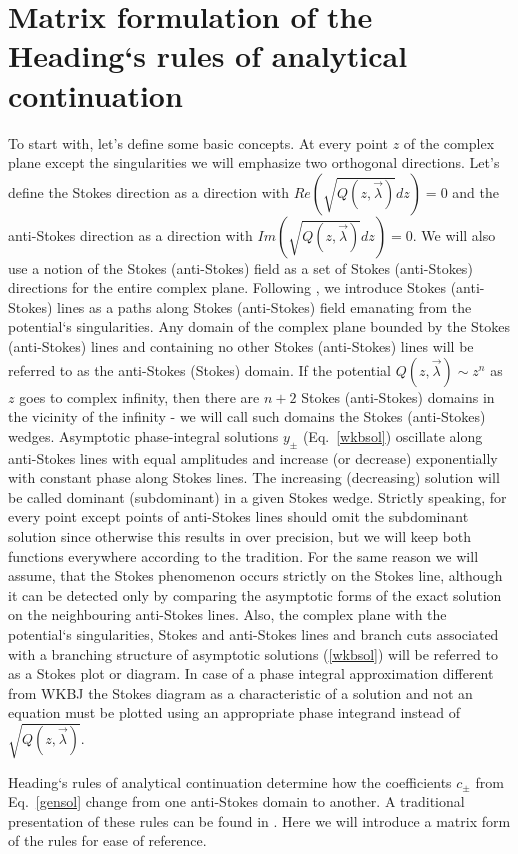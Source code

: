 \documentclass[aps,prl,preprint,superscriptaddress]{revtex4}
\begin{document}
\section{Matrix formulation of the Heading`s rules of analytical continuation \label{MTRXFRM}}
To start with, let's define some basic concepts. At every point $z$ of the complex plane except the singularities we will emphasize two orthogonal directions. Let's define the Stokes direction 
as a direction with $Re \left( \sqrt{Q(z,\vec{\lambda})}dz \right)=0$ and the anti-Stokes direction 
as a direction with $Im \left( \sqrt{Q(z,\vec{\lambda})}dz \right)=0$. We will also use a notion of the Stokes (anti-Stokes) field as a set of Stokes (anti-Stokes) directions for the entire complex plane. Following \cite{heading, white}, we introduce Stokes (anti-Stokes) lines as a paths along Stokes (anti-Stokes) field emanating from the potential`s singularities. Any domain of the complex plane bounded by the Stokes (anti-Stokes) lines and containing no other Stokes (anti-Stokes) lines will be referred to as the anti-Stokes (Stokes) domain. If the potential $Q(z,\vec{\lambda}) \sim z^n$ as $z$ goes to complex infinity, then there are $n+2$ Stokes (anti-Stokes) domains in the vicinity of the infinity - we will call such domains the Stokes (anti-Stokes) wedges. Asymptotic phase-integral solutions $y_\pm$ (Eq.~\ref{wkbsol}) oscillate along anti-Stokes lines with equal amplitudes and increase (or decrease) exponentially with constant phase along Stokes lines. The increasing (decreasing) solution will be called dominant (subdominant) in a given Stokes wedge. Strictly speaking, for every point except points of anti-Stokes lines should omit the subdominant solution since otherwise this results in over precision, but we will keep both functions everywhere according to the tradition. For the same reason we will assume, that the Stokes phenomenon occurs strictly on the Stokes line, although it can be detected only by comparing the asymptotic forms of the exact solution on the neighbouring anti-Stokes lines. Also, the complex plane with the potential`s singularities, Stokes and anti-Stokes lines and branch cuts associated with a branching structure of asymptotic solutions (\ref{wkbsol}) will be referred to as a Stokes plot or diagram. In case of a phase integral approximation different from WKBJ the Stokes diagram as a characteristic of a solution and not an equation must be plotted using an appropriate phase integrand instead of $\sqrt{Q(z,\vec{\lambda})}$.

Heading`s rules of analytical continuation determine how the coefficients $c_\pm$ from Eq.~\ref{gensol} change from one anti-Stokes domain to another. A traditional presentation of these rules can be found in \cite{heading, white}. Here we will introduce a matrix form of the rules for ease of reference.
\end{document}
